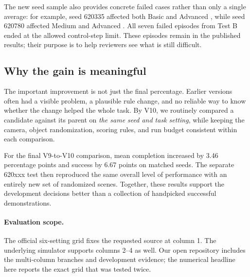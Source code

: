 The new seed sample also provides concrete failed cases rather than only a single average: for example, seed 620335 affected both Basic and Advanced \pFive, while seed 620780 affected Medium and Advanced \pTen. All seven failed episodes from Test B ended at the allowed control-step limit. These episodes remain in the published results; their purpose is to help reviewers see what is still difficult.

\subsection{Why the gain is meaningful}
The important improvement is not just the final percentage. Earlier versions often had a visible problem, a plausible rule change, and no reliable way to know whether the change helped the whole task. By V10, we routinely compared a candidate against its parent on \emph{the same seed and task setting}, while keeping the camera, object randomization, scoring rules, and run budget consistent within each comparison.

For the final V9-to-V10 comparison, mean completion increased by 3.46 percentage points and success by 6.67 points on matched seeds. The separate 620xxx test then reproduced the same overall level of performance with an entirely new set of randomized scenes. Together, these results support the development decisions better than a collection of handpicked successful demonstrations.

\paragraph{Evaluation scope.}
The official six-setting grid fixes the requested source at column 1. The underlying simulator supports columns 2--4 as well. Our open repository includes the multi-column branches and development evidence; the numerical headline here reports the exact grid that was tested twice.
